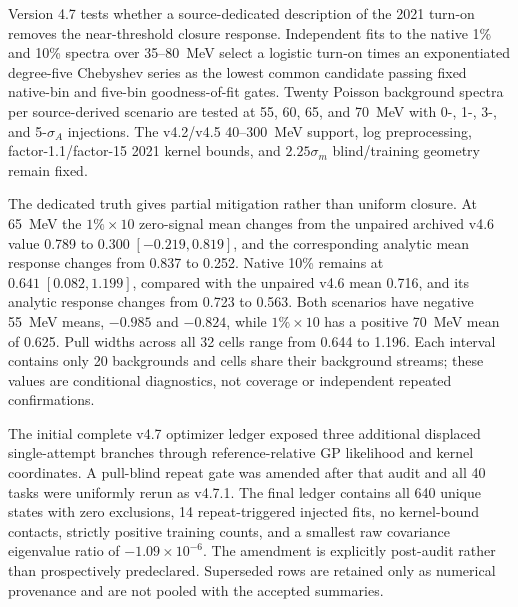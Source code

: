 Version 4.7 tests whether a source-dedicated description of the 2021 turn-on
removes the near-threshold closure response.  Independent fits to the native
1\% and 10\% spectra over 35--80~MeV select a logistic turn-on times an
exponentiated degree-five Chebyshev series as the lowest common candidate
passing fixed native-bin and five-bin goodness-of-fit gates.  Twenty Poisson
background spectra per source-derived scenario are tested at 55, 60, 65, and
70~MeV with 0-, 1-, 3-, and 5-$\sigma_A$ injections.  The v4.2/v4.5
40--300~MeV support, log preprocessing, factor-1.1/factor-15 2021 kernel
bounds, and $2.25\sigma_m$ blind/training geometry remain fixed.

The dedicated truth gives partial mitigation rather than uniform closure.  At
65~MeV the $1\%\times10$ zero-signal mean changes from the unpaired archived
v4.6 value 0.789 to $0.300\;[-0.219,0.819]$, and the corresponding analytic
mean response changes from 0.837 to 0.252.  Native 10\% remains at
$0.641\;[0.082,1.199]$, compared with the unpaired v4.6 mean 0.716, and its
analytic response changes from 0.723 to 0.563.  Both scenarios have negative
55~MeV means, $-0.985$ and $-0.824$, while $1\%\times10$ has a positive
70~MeV mean of 0.625.  Pull widths across all 32 cells range from 0.644 to
1.196.  Each interval contains only 20 backgrounds and cells share their
background streams; these values are conditional diagnostics, not coverage or
independent repeated confirmations.

The initial complete v4.7 optimizer ledger exposed three additional displaced
single-attempt branches through reference-relative GP likelihood and kernel
coordinates.  A pull-blind repeat gate was amended after that audit and all 40
tasks were uniformly rerun as v4.7.1.  The final ledger contains all 640 unique
states with zero exclusions, 14 repeat-triggered injected fits, no kernel-bound
contacts, strictly positive training counts, and a smallest raw covariance
eigenvalue ratio of $-1.09\times10^{-6}$.  The amendment is explicitly
post-audit rather than prospectively predeclared.  Superseded rows are retained
only as numerical provenance and are not pooled with the accepted summaries.

